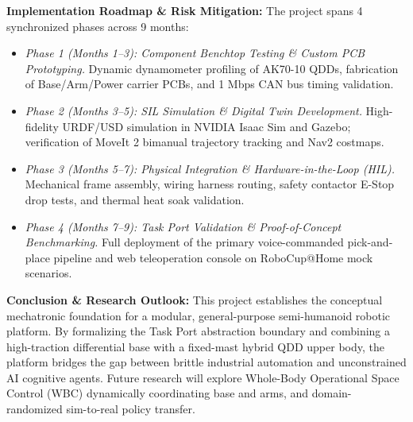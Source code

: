 \documentclass[10pt,a4paper]{article}
\begin{document}
\textbf{Implementation Roadmap \& Risk Mitigation:} The project spans 4 synchronized phases across 9 months:
\begin{itemize}[leftmargin=1.2em,noitemsep,topsep=1pt]
  \item \emph{Phase 1 (Months 1--3): Component Benchtop Testing \& Custom PCB Prototyping.} Dynamic dynamometer profiling of AK70-10 QDDs, fabrication of Base/Arm/Power carrier PCBs, and 1 Mbps CAN bus timing validation.
  \item \emph{Phase 2 (Months 3--5): SIL Simulation \& Digital Twin Development.} High-fidelity URDF/USD simulation in NVIDIA Isaac Sim and Gazebo; verification of MoveIt 2 bimanual trajectory tracking and Nav2 costmaps.
  \item \emph{Phase 3 (Months 5--7): Physical Integration \& Hardware-in-the-Loop (HIL).} Mechanical frame assembly, wiring harness routing, safety contactor E-Stop drop tests, and thermal heat soak validation.
  \item \emph{Phase 4 (Months 7--9): Task Port Validation \& Proof-of-Concept Benchmarking.} Full deployment of the primary voice-commanded pick-and-place pipeline and web teleoperation console on RoboCup@Home mock scenarios.
\end{itemize}

\textbf{Conclusion \& Research Outlook:} This project establishes the conceptual mechatronic foundation for a modular, general-purpose semi-humanoid robotic platform. By formalizing the Task Port abstraction boundary and combining a high-traction differential base with a fixed-mast hybrid QDD upper body, the platform bridges the gap between brittle industrial automation and unconstrained AI cognitive agents. Future research will explore Whole-Body Operational Space Control (WBC) dynamically coordinating base and arms, and domain-randomized sim-to-real policy transfer.
\end{document}

